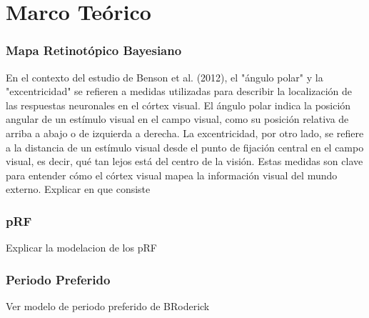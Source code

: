 \chapter{Marco Te\'orico}\label{chapter:theory}

\subsection*{Mapa Retinot\'opico Bayesiano}
En el contexto del estudio de Benson et al. (2012), el "ángulo polar" y la "excentricidad" se refieren a medidas utilizadas para describir la localización de las respuestas neuronales en el córtex visual. El ángulo polar indica la posición angular de un estímulo visual en el campo visual, como su posición relativa de arriba a abajo o de izquierda a derecha. La excentricidad, por otro lado, se refiere a la distancia de un estímulo visual desde el punto de fijación central en el campo visual, es decir, qué tan lejos está del centro de la visión. Estas medidas son clave para entender cómo el córtex visual mapea la información visual del mundo externo.
Explicar en que consiste
\subsection*{pRF}
Explicar la modelacion de los pRF
\subsection*{Periodo Preferido}
Ver modelo de periodo preferido de BRoderick